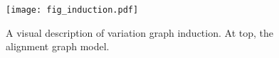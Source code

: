 \vspace{-1em}
\begin{figure}[ht!]
   \texttt{[image: fig\_induction.pdf]}
   \caption{
   A visual description of variation graph induction.
   At top, the alignment graph model.
    }
\end{figure}
\vspace{-1em}
